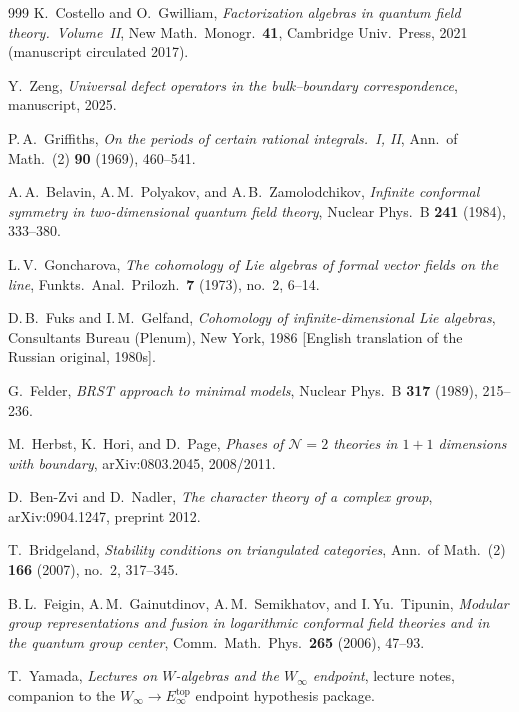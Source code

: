 \documentclass[11pt]{memoir}
\begin{document}
\begin{thebibliography}{999}
K.~Costello and O.~Gwilliam, \emph{Factorization algebras in quantum field theory.\ Volume~II}, New Math.\ Monogr.\ \textbf{41}, Cambridge Univ.\ Press, 2021 (manuscript circulated 2017).

Y.~Zeng, \emph{Universal defect operators in the bulk--boundary correspondence}, manuscript, 2025.

P.\,A.~Griffiths, \emph{On the periods of certain rational integrals.~I, II}, Ann.\ of Math.\ (2) \textbf{90} (1969), 460--541.

A.\,A.~Belavin, A.\,M.~Polyakov, and A.\,B.~Zamolodchikov, \emph{Infinite conformal symmetry in two-dimensional quantum field theory}, Nuclear Phys.\ B \textbf{241} (1984), 333--380.

L.\,V.~Goncharova, \emph{The cohomology of Lie algebras of formal vector fields on the line}, Funkts.\ Anal.\ Prilozh.\ \textbf{7} (1973), no.~2, 6--14.

D.\,B.~Fuks and I.\,M.~Gelfand, \emph{Cohomology of infinite-dimensional Lie algebras}, Consultants Bureau (Plenum), New York, 1986 [English translation of the Russian original, 1980s].

G.~Felder, \emph{BRST approach to minimal models}, Nuclear Phys.\ B \textbf{317} (1989), 215--236.

M.~Herbst, K.~Hori, and D.~Page, \emph{Phases of $\mathcal N = 2$ theories in $1+1$ dimensions with boundary}, arXiv:0803.2045, 2008/2011.

D.~Ben-Zvi and D.~Nadler, \emph{The character theory of a complex group}, arXiv:0904.1247, preprint 2012.

T.~Bridgeland, \emph{Stability conditions on triangulated categories}, Ann.\ of Math.\ (2) \textbf{166} (2007), no.~2, 317--345.

B.\,L.~Feigin, A.\,M.~Gainutdinov, A.\,M.~Semikhatov, and I.\,Yu.~Tipunin, \emph{Modular group representations and fusion in logarithmic conformal field theories and in the quantum group center}, Comm.\ Math.\ Phys.\ \textbf{265} (2006), 47--93.

T.~Yamada, \emph{Lectures on $W$-algebras and the $W_\infty$ endpoint}, lecture notes, companion to the $W_\infty \to E_\infty^{\mathrm{top}}$ endpoint hypothesis package.



\end{thebibliography}
\end{document}
